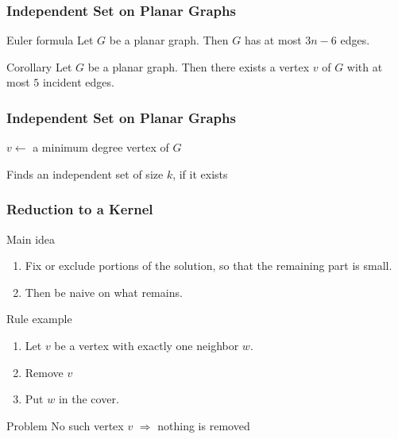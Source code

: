 \documentclass[12pt,aspectratio=169]{beamer}
\begin{document}
\begin{frame}\frametitle{Independent Set on Planar Graphs}
\begin{block}{Euler formula}
Let $G$ be a planar graph.
Then $G$ has at most $3n - 6$ edges.
\end{block}

\begin{block}{Corollary}
Let $G$ be a planar graph.
Then there exists a vertex $v$ of $G$ with at most $5$ incident edges.
\end{block}
\end{frame}

\begin{frame}\frametitle{Independent Set on Planar Graphs}
\begin{algorithm}[H]
$v\gets$ a minimum degree vertex of $G$
\caption{Finds an independent set of size $k$, if it exists}
\end{algorithm}
\end{frame}

\begin{frame}\frametitle{Reduction to a Kernel}
\begin{block}{Main idea}
\begin{enumerate}
    \item
      Fix or exclude portions of the solution, so that the remaining part is small.
\item
    Then be naive on what remains.
\end{enumerate}
\end{block}

 \begin{block}{Rule example}
 \begin{enumerate}
  \item
    Let $v$ be a vertex with exactly one neighbor $w$.
  \item
     Remove $v$
 \item
     Put $w$ in the cover.
  \end{enumerate}
  \end{block}
  \begin{block}{Problem}
  No such vertex $v$  $\Rightarrow$ nothing is removed
  \end{block}
  \end{frame}
\end{document}
